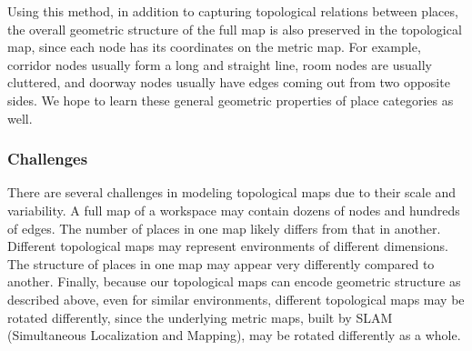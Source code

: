 \documentclass[10pt, titlepage]{article}
\theoremstyle{definition}
\begin{document}
Using this method, in addition to capturing topological relations between places, the overall geometric structure of the full map is also preserved in the topological map, since each node has its coordinates on the metric map. For example, corridor nodes usually form a long and straight line, room nodes are usually cluttered, and doorway nodes usually have edges coming out from two opposite sides. We hope to learn these general geometric properties of place categories as well.

\subsubsection{Challenges}
There are several challenges in modeling topological maps due to their scale and variability. A full map of a workspace may contain dozens of nodes and hundreds of edges. The number of places in one map likely differs from that in another. Different topological maps may represent environments of different dimensions. The structure of places in one map may appear very differently compared to another. Finally, because our topological maps can encode geometric structure as described above, even for similar environments, different topological maps may be rotated differently, since the underlying metric maps, built by SLAM (Simultaneous Localization and Mapping), may be rotated differently as a whole.
\end{document}
